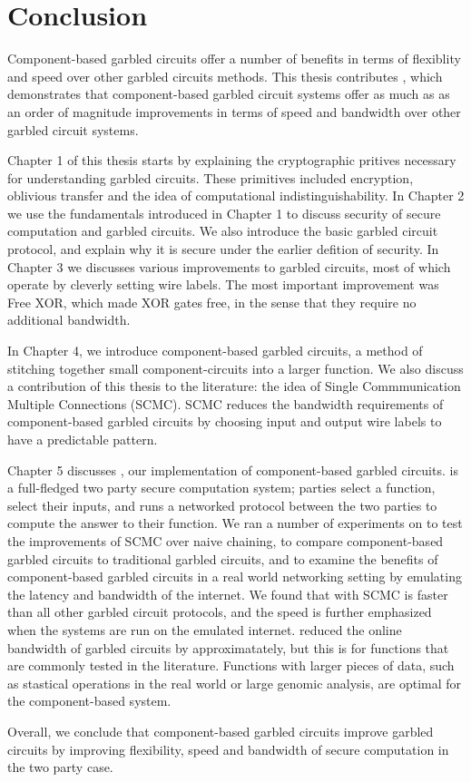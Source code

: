 \chapter*{Conclusion}
	\setcounter{chapter}{4}
	\setcounter{section}{0}
	
Component-based garbled circuits offer a number of benefits in terms of flexiblity and speed over other garbled circuits methods.
This thesis contributes \CompGC, which demonstrates that component-based garbled circuit systems offer as much as as an order of magnitude improvements in terms of speed and bandwidth over other garbled circuit systems.

Chapter 1 of this thesis starts by explaining the cryptographic pritives necessary for understanding garbled circuits.
These primitives included encryption, oblivious transfer and the idea of computational indistinguishability.
In Chapter 2 we use the fundamentals introduced in Chapter 1 to discuss security of secure computation and garbled circuits.
We also introduce the basic garbled circuit protocol, and explain why it is secure under the earlier defition of security.
In Chapter 3 we discusses various improvements to garbled circuits, most of which operate by cleverly setting wire labels.
The most important improvement was Free XOR, which made XOR gates free, in the sense that they require no additional bandwidth.

In Chapter 4, we introduce component-based garbled circuits, a method of stitching together small component-circuits into a larger function.
We also discuss a contribution of this thesis to the literature: the idea of Single Commmunication Multiple Connections (SCMC).
SCMC reduces the bandwidth requirements of component-based garbled circuits by choosing input and output wire labels to have a predictable pattern.

Chapter 5 discusses \CompGC, our implementation of component-based garbled circuits.
\CompGC is a full-fledged two party secure computation system; parties select a function, select their inputs, and \CompGC runs a networked protocol between the two parties to compute the answer to their function.
We ran a number of experiments on \CompGC to test the improvements of SCMC over naive chaining, to compare component-based garbled circuits to traditional garbled circuits, and to examine the benefits of component-based garbled circuits in a real world networking setting by emulating the latency and bandwidth of the internet.
We found that \CompGC with SCMC is faster than all other garbled circuit protocols, and the speed is further emphasized when the systems are run on the emulated internet.
\CompGC reduced the online bandwidth of garbled circuits by approximatately, but this is for functions that are commonly tested in the literature.
Functions with larger pieces of data, such as stastical operations in the real world or large genomic analysis, are optimal for the component-based system.

Overall, we conclude that component-based garbled circuits improve garbled circuits by improving flexibility, speed and bandwidth of secure computation in the two party case.


